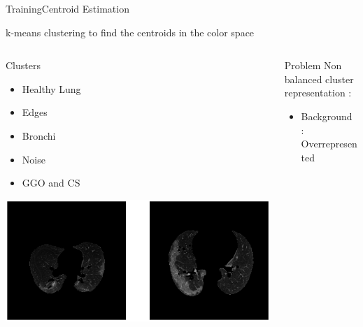 \documentclass{standalone}
\begin{document}
	\begin{frame}{Training}{Centroid Estimation}
		\begin{block}{}
			\centering
			k-means clustering to find the centroids in the color space
		\end{block}
		
		\begin{columns}
			\begin{column}{.5\textwidth}
				
				\begin{block}{Clusters}
					\begin{itemize}
						
						\item Healthy Lung
						
						\item Edges
						 
						\item Bronchi
						
						\item Noise
						
						\item GGO and CS
						
					\end{itemize}
				\end{block}
			
			\centering\includegraphics[width=\linewidth]{./img/ClusterRepr.png}
			\end{column}
		
			\begin{column}{.4\textwidth}
					\begin{alertblock}{Problem}	\setlength\itemsep{1.em}						
						\scriptsize{Non balanced cluster representation :} 
						\begin{itemize}
							\item Background :  Overrepresented
							

\end{itemize}
\end{alertblock}
\end{column}
\end{columns}
\end{frame}
\end{document}
